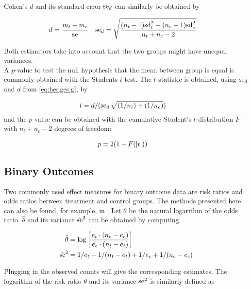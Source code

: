 \documentclass[11pt,a4paper,twoside]{book}\usepackage[]{graphicx}\usepackage[]{color}
\begin{document}
Cohen's $d$ and its standard error $\operatorname{se}_d$ can similarly be obtained by

\begin{align}
d &= \frac{m_t - m_c}{\operatorname{se}} \label{eq:hedges.g} & \operatorname{se}_d &= \sqrt{\frac{(n_t - 1)\textrm{sd}_t^2 + (n_c - 1)\textrm{sd}_c^2}{n_t + n_c - 2}}
\end{align}

Both estimators take into account that the two groups might have unequal variances. \\ 
A  $p$\hspace{0.4mm}-value to test the null hypothesis that the mean between group is equal is commonly obtained with the Students $t$-test. The $t$ statistic is obtained, using $\operatorname{se}_d$ and $d$ from \eqref{eq:hedges.g}, by

\begin{align}
t &= d/(\operatorname{se}_d\sqrt{(1/n_t)+(1/n_c)}) \nonumber
\end{align}
and the  $p$\hspace{0.4mm}-value can be obtained with the cumulative Student's $t$-distribution $F$ with $n_t + n_c - 2$ degrees of freedom:

\begin{align}
p &= 2(1-F(\left\lvert t\right\rvert)) \nonumber
\end{align}


\subsection{Binary Outcomes}
Two commonly used effect measures for binary outcome data are risk ratios and odds ratios between treatment and control groups. 
The methods presented here can also be found, for example, in \cite[34]{Intro.meta}.
Let $\theta$ be the natural logarithm of the odds ratio. $\hat{\theta}$ and its variance $\hat{\operatorname{se}}^2$ can be obtained by computing

\begin{align}
\hat{\theta} &= \log\bigg[\frac{e_t\cdot(n_c - e_c)}{e_c\cdot(n_t - e_t)}\bigg] \nonumber \\
\hat{\operatorname{se}}^2 &= 1/e_t + 1/(n_t - e_t) + 1/e_c + 1/(n_c - e_c) \nonumber
\end{align}

Plugging in the observed counts will give the corresponding estimates. The logarithm of the risk ratio $\theta$ and its variance $\operatorname{se}^2$ is similarly defined as
\end{document}
